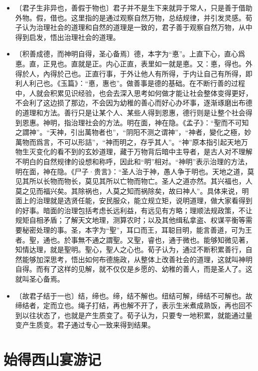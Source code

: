 \documentclass[12pt,UTF-8,openany,a4]{ctexbook}
\begin{document}
\begin{itemize}
    \setlength\itemsep{-0.2em}
    \item〔君子生非异也，善假于物也〕{\yiwen 君子并不是生下来就异于常人，只是善于借助外物。假，借也。这里指的是通过观察自然万物，总结规律，并引发灵感。荀子认为治理社会的道理和自然的道理是一致的，君子善于观察自然万物，从中得到启发，悟出治理社会的道理。}
    \item〔积善成德，而神明自得，圣心备焉〕{\yiwen 德，本字为“悳”。上直下心，直心爲悳。直，正見也。直就是正。内心正直，表里如一就是悳。又：悳，得也。外得於人，內得於己也。正直行事，于外让他人有所得，于内让自己有所得，即利人利己也。《玉篇》：“悳，惠也”。做善事是德的基础。在不断行善的过程中，人就会积累见识经验，也会去深入思考如何做才能让社会整体变得更好，不会利了这边损了那边，不会因为幼稚的善心而好心办坏事，逐渐琢磨出布德的道理和方法。善行只是让某个人、某些人得到恩惠，德行则是让整个社会得到恩惠。神明，指治理社会的方法。明在面，神在隐。《孟子》：“聖而不可知之謂神”。“天神，引出萬物者也”，“阴阳不测之谓神”，“神者，變化之極，妙萬物而爲言，不可以形詰”，“神而明之，存乎其人”。“神”原本指引起天地万物生灭变化的看不到的玄妙道理，藏于万物背后暗中主导者，是古人对不理解不明白的自然规律的设想和称呼，因此和“明”相对。“神明”表示治理的方法，明在面，神在隐。《尸子·贵言》：“圣人治于神，愚人争于明也。天地之道，莫见其所以长物而物长，莫见其所以亡物而物亡。圣人之道亦然。其兴福也，人莫之见而福兴矣。其除祸也，人莫之知而祸除矣，故曰神人”。具体来说，明面上的治理就是选贤任能，安民服众，能立规立矩，说明道理，做大家看得到的好事。暗面的治理包括考虑长远利益，有远见有方略；理顺法规政策，不让规矩自相矛盾；了解天文地理，测算农时；以及其他缉私拿盗、权谋平衡等需要秘密处理的事。圣，本字为“聖”，耳口而王，耳聪目明，能言善道，可为王者。聖，通也。於事無不通之謂聖。又聖，睿也，通于微也。能够知微见著，知情达理，就是聖明。聖心，聖人之心也。荀子认为，通过不断积累善行，自然能够加深思考，悟出如何布德施政，从整体上改善社会的道理，这就叫神明自得。而有了这样的见解，就不仅仅是乡愿的、幼稚的善人，而是圣人了。这就叫圣心备焉。}
    \item〔故君子结于一也〕{\yiwen 结，缔也。缔，结不解也。纽结可解，缔结不可解也。故缔结者，定而立也。绳子打结，再也解不开了，表示生米煮成熟饭，再也回不到以往状态了，也就是产生质变了。荀子认为，只要专一地积累，就能通过量变产生质变。君子通过专心一致来得到结果。}
\end{itemize}


\chapter{始得西山宴游记}
\end{document}
